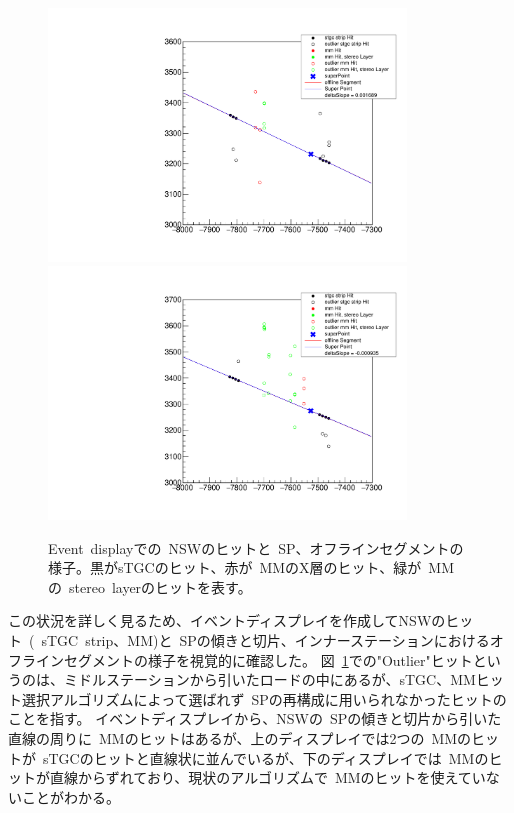 \begin{figure}[h]
      \centering
      \includegraphics[clip, width=9.5cm]{fig/5/EventDisplay_46_ZR_withMM.pdf}
      \centering
      \includegraphics[clip, width=9.5cm]{fig/5/EventDisplay_3806_ZR_withMM.pdf}
  \caption{Event~displayでの~NSWのヒットと~SP、オフラインセグメントの様子。黒がsTGCのヒット、赤が~MMのX層のヒット、緑が~MMの~stereo~layerのヒットを表す。}\label{fig:eventDisplay}
\end{figure}

この状況を詳しく見るため、イベントディスプレイを作成してNSWのヒット~(~sTGC~strip、MM)と~SPの傾きと切片、インナーステーションにおけるオフラインセグメントの様子を視覚的に確認した。
図~\ref{fig:eventDisplay}での"Outlier"ヒットというのは、ミドルステーションから引いたロードの中にあるが、sTGC、MMヒット選択アルゴリズムによって選ばれず~SPの再構成に用いられなかったヒットのことを指す。
イベントディスプレイから、NSWの~SPの傾きと切片から引いた直線の周りに~MMのヒットはあるが、上のディスプレイでは2つの~MMのヒットが~sTGCのヒットと直線状に並んでいるが、下のディスプレイでは~MMのヒットが直線からずれており、現状のアルゴリズムで~MMのヒットを使えていないことがわかる。

